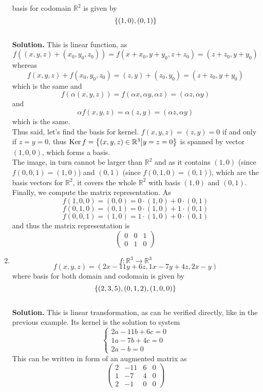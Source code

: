 \documentclass[12pt,fleqn]{article} %
\begin{document}
\begin{enumerate}
	basis for codomain $\mathbb{R}^2$ is given by
	\[\left\{(1,0),(0,1)\right\}\]
	\\\textbf{Solution.} This is linear function, as
	\[f((x,y,z)+(x_0,y_0,z_0))=f(x+x_0,y+y_0,z+z_0)=(z+z_0,y+y_0)\]
	whereas 
	\[f(x,y,z)+f(x_0,y_0,z_0)=(z,y)+(z_0,y_0)=(z+z_0,y+y_0)\]
	which is the same and
	\[f(\alpha(x,y,z))=f(\alpha x,\alpha y,\alpha z)=(\alpha z,\alpha y)\]
	and
	\[\alpha f(x,y,z)=\alpha(z,y)=(\alpha z,\alpha y)\]
	which is the same.\\
	Thus said, let's find the basis for kernel. $f(x,y,z)=(z,y)=0$ if and only if $z=y=0$, thus
	$\operatorname{Ker} f=\left\{(x,y,z)\in\mathbb{R}^3\big| y=z=0\right\}$ is spanned by vector $(1,0,0)$, which forms a basis.\\
	The image, in turn cannot be larger than $\mathbb{R}^2$ and as it contains $(1,0)$ (since $f(0,0,1)=(1,0)$)
	and $(0,1)$ (since $f(0,1,0)=(0,1)$), which are the basis vectors for $\mathbb{R}^2$, it covers the whole $\mathbb{R}^2$
	with basis $(1,0)$ and $(0,1)$.\\
	Finally, we compute the matrix representation. As
	\[f(1,0,0)=(0,0)=0\cdot(1,0)+0\cdot(0,1)\]
	\[f(0,1,0)=(0,1)=0\cdot(1,0)+1\cdot(0,1)\]
	\[f(0,0,1)=(1,0)=1\cdot(1,0)+0\cdot(0,1)\]
	and thus the matrix representation is
	\[\begin{pmatrix}0&0&1\\0&1&0\end{pmatrix}\]
\item \[f:\mathbb{R}^3\to\mathbb{R}^3\]%
	\[f(x,y,z)=(2x-11y+6z,1x-7y+4z,2x-y)\]
	where basis for both domain and codomain is given by
	\[\left\{(2,3,5),(0,1,2),(1,0,0)\right\}\]
	\\\textbf{Solution.} 
	This is linear transformation, as can be verified directly, like in the previous example. Its kernel is the solution
	to system
	\[\begin{cases}2a-11b+6c=0\\1a-7b+4c=0\\2a-b=0\end{cases}\]
	This can be written in form of an augmented matrix as
	\newcommand{\myexplainiii}[3]{#1\xrightarrow{\text{#2}}#3}
	\newcommand{\myexplainiv}[4]{#1\xrightarrow{\begin{subarray}{c}\text{#2}\\\text{#3}\end{subarray}}#4}
	\[\left(\begin{array}{rrr|r}2&-11&6&0\\1&-7&4&0\\2&-1&0&0\end{array}\right)\]

\end{enumerate}
\end{document}

